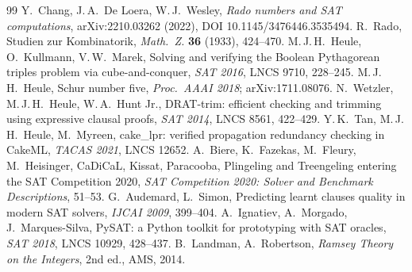 \documentclass[11pt,a4paper]{article}
\theoremstyle{remark}
\begin{document}
\begin{thebibliography}{99}
 Y.~Chang, J.\,A.~De Loera, W.\,J.~Wesley, \emph{Rado numbers and SAT computations}, arXiv:2210.03262 (2022), DOI 10.1145/3476446.3535494.
 R.~Rado, Studien zur Kombinatorik, \emph{Math.\ Z.} \textbf{36} (1933), 424--470.
 M.\,J.\,H.~Heule, O.~Kullmann, V.\,W.~Marek, Solving and verifying the Boolean Pythagorean triples problem via cube-and-conquer, \emph{SAT 2016}, LNCS 9710, 228--245.
 M.\,J.\,H.~Heule, Schur number five, \emph{Proc.\ AAAI 2018}; arXiv:1711.08076.
 N.~Wetzler, M.\,J.\,H.~Heule, W.\,A.~Hunt Jr., DRAT-trim: efficient checking and trimming using expressive clausal proofs, \emph{SAT 2014}, LNCS 8561, 422--429.
 Y.\,K.~Tan, M.\,J.\,H.~Heule, M.~Myreen, cake\_lpr: verified propagation redundancy checking in CakeML, \emph{TACAS 2021}, LNCS 12652.
 A.~Biere, K.~Fazekas, M.~Fleury, M.~Heisinger, CaDiCaL, Kissat, Paracooba, Plingeling and Treengeling entering the SAT Competition 2020, \emph{SAT Competition 2020: Solver and Benchmark Descriptions}, 51--53.
 G.~Audemard, L.~Simon, Predicting learnt clauses quality in modern SAT solvers, \emph{IJCAI 2009}, 399--404.
 A.~Ignatiev, A.~Morgado, J.~Marques-Silva, PySAT: a Python toolkit for prototyping with SAT oracles, \emph{SAT 2018}, LNCS 10929, 428--437.
 B.~Landman, A.~Robertson, \emph{Ramsey Theory on the Integers}, 2nd ed., AMS, 2014.
\end{thebibliography}
\end{document}
